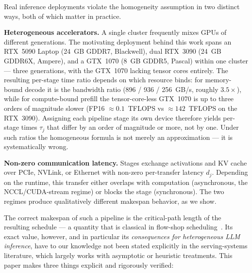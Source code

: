 \documentclass[11pt]{article}
\begin{document}
Real inference deployments violate the homogeneity assumption in two distinct ways, both of which matter in practice.

\textbf{Heterogeneous accelerators.} A single cluster frequently mixes GPUs of different generations. The motivating deployment behind this work spans an RTX~5090 Laptop (24~GB GDDR7, Blackwell), dual RTX~3090 (24~GB GDDR6X, Ampere), and a GTX~1070 (8~GB GDDR5, Pascal) within one cluster --- three generations, with the GTX~1070 lacking tensor cores entirely. The resulting per-stage time ratio depends on which resource binds: for memory-bound decode it is the bandwidth ratio (896 / 936 / 256~GB/s, roughly $3.5\times$), while for compute-bound prefill the tensor-core-less GTX~1070 is up to three orders of magnitude slower (FP16 $\approx 0.1$~TFLOPS vs $\approx 142$~TFLOPS on the RTX~3090). Assigning each pipeline stage its own device therefore yields per-stage times $\tau_j$ that differ by an order of magnitude or more, not by one. Under such ratios the homogeneous formula is not merely an approximation --- it is systematically wrong.

\textbf{Non-zero communication latency.} Stages exchange activations and KV cache over PCIe, NVLink, or Ethernet with non-zero per-transfer latency $d_j$. Depending on the runtime, this transfer either overlaps with computation (asynchronous, the NCCL/CUDA-stream regime) or blocks the stage (synchronous). The two regimes produce qualitatively different makespan behavior, as we show.

The correct makespan of such a pipeline is the critical-path length of the resulting schedule --- a quantity that is classical in flow-shop scheduling~\cite{r2,r3}. Its exact value, however, and in particular its \emph{consequences for heterogeneous LLM inference}, have to our knowledge not been stated explicitly in the serving-systems literature, which largely works with asymptotic or heuristic treatments. This paper makes three things explicit and rigorously verified:
\end{document}
